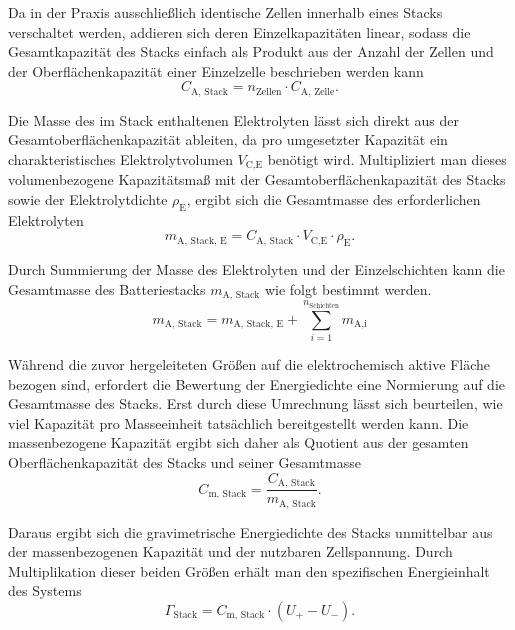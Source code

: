 Da in der Praxis ausschließlich identische Zellen innerhalb eines Stacks verschaltet werden, addieren sich deren Einzelkapazitäten linear, sodass die Gesamtkapazität des Stacks einfach als Produkt aus der Anzahl der Zellen und der Oberflächenkapazität einer Einzelzelle beschrieben werden kann
\begin{equation}
    \label{eq:capacity_stack}
    C_{\text{A, Stack}} = n_{\text{Zellen}} \cdot C_{\text{A, Zelle}}.
\end{equation}

Die Masse des im Stack enthaltenen Elektrolyten lässt sich direkt aus der Gesamtoberflächenkapazität ableiten, da pro umgesetzter Kapazität ein charakteristisches Elektrolytvolumen $V_{\text{C,E}}$ benötigt wird. Multipliziert man dieses volumenbezogene Kapazitätsmaß mit der Gesamtoberflächenkapazität des Stacks sowie der Elektrolytdichte $\rho_{\text{E}}$, ergibt sich die Gesamtmasse des erforderlichen Elektrolyten
\begin{equation}
    m_{\text{A, Stack, E}} = C_{\text{A, Stack}} \cdot V_{\text{C,E}} \cdot \rho_{\text{E}}.
\end{equation}

Durch Summierung der Masse des Elektrolyten und der Einzelschichten kann die Gesamtmasse des Batteriestacks $m_{\text{A, Stack}}$ wie folgt bestimmt werden.
\begin{equation}
    m_{\text{A, Stack}} = m_{\text{A, Stack, E}} + \sum_{i=1}^{n_{\text{Schichten}}} m_{\text{A,i}}
\end{equation}

Während die zuvor hergeleiteten Größen auf die elektrochemisch aktive Fläche bezogen sind, erfordert die Bewertung der Energiedichte eine Normierung auf die Gesamtmasse des Stacks. Erst durch diese Umrechnung lässt sich beurteilen, wie viel Kapazität pro Masseeinheit tatsächlich bereitgestellt werden kann. Die massenbezogene Kapazität ergibt sich daher als Quotient aus der gesamten Oberflächenkapazität des Stacks und seiner Gesamtmasse
\begin{equation}
    C_{\text{m, Stack}} = \frac{C_{\text{A, Stack}} }{ m_{\text{A, Stack}}}.
\end{equation}

Daraus ergibt sich die gravimetrische Energiedichte des Stacks unmittelbar aus der massenbezogenen Kapazität und der nutzbaren Zellspannung. Durch Multiplikation dieser beiden Größen erhält man den spezifischen Energieinhalt des Systems
\begin{equation}
    \label{eq:grav_energy_density}
    \Gamma_{\text{Stack}} = C_{\text{m, Stack}} \cdot \left(U_{+} - U_{-}\right).
\end{equation}

